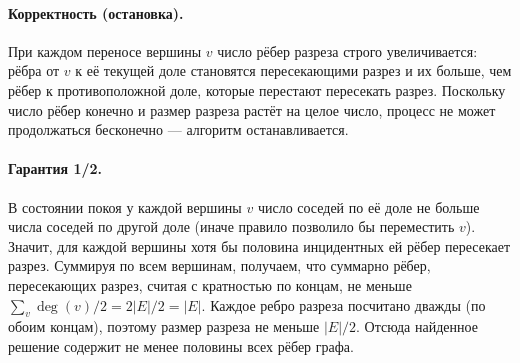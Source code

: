 \documentclass[12pt]{article}
\begin{document}
  \paragraph{Корректность (остановка).}
  При каждом переносе вершины $v$ число рёбер разреза строго увеличивается: рёбра от $v$ к её текущей доле становятся пересекающими разрез и их больше, чем рёбер к противоположной доле, которые перестают пересекать разрез. Поскольку число рёбер конечно и размер разреза растёт на целое число, процесс не может продолжаться бесконечно — алгоритм останавливается.

  \paragraph{Гарантия 1/2.}
  В состоянии покоя у каждой вершины $v$ число соседей по её доле не больше числа соседей по другой доле (иначе правило позволило бы переместить $v$). Значит, для каждой вершины хотя бы половина инцидентных ей рёбер пересекает разрез. Суммируя по всем вершинам, получаем, что суммарно рёбер, пересекающих разрез, считая с кратностью по концам, не меньше $\sum_v \deg(v)/2 = 2|E|/2=|E|$. Каждое ребро разреза посчитано дважды (по обоим концам), поэтому размер разреза не меньше $|E|/2$. Отсюда найденное решение содержит не менее половины всех рёбер графа.
\end{document}
